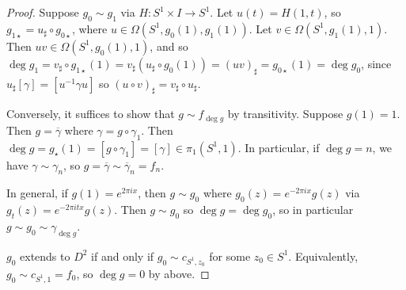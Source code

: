 \begin{proof}
	Suppose \( g_0 \sim g_1 \) via \( H \colon S^1 \times I \to S^1 \).
	Let \( u(t) = H(1,t) \), so \( g_{1\star} = u_\sharp \circ g_{0\star} \), where \( u \in \Omega(S^1,g_0(1),g_1(1)) \).
	Let \( v \in \Omega(S^1,g_1(1),1) \).
	Then \( uv \in \Omega(S^1,g_0(1),1) \), and so \( \deg g_1 = v_\sharp \circ g_{1\star}(1) = v_\sharp(u_\sharp\circ g_0(1)) = (uv)_\sharp = g_{0\star}(1) = \deg g_0 \), since \( u_\sharp[\gamma] = [u^{-1}\gamma u] \) so \( (u \circ v)_\sharp = v_\sharp \circ u_\sharp \).

	Conversely, it suffices to show that \( g \sim f_{\deg g} \) by transitivity.
	Suppose \( g(1) = 1 \).
	Then \( g = \overline \gamma \) where \( \gamma = g \circ \gamma_1 \).
	Then \( \deg g = g_\star(1) = [g \circ \gamma_1] = [\gamma] \in \pi_1(S^1,1) \).
	In particular, if \( \deg g = n \), we have \( \gamma \sim \gamma_n \), so \( g = \overline \gamma \sim \overline \gamma_n = f_n \).

	In general, if \( g(1) = e^{2\pi i x} \), then \( g \sim g_0 \) where \( g_0(z) = e^{-2\pi i x}g(z) \) via \( g_t(z) = e^{-2\pi i t x}g(z) \).
	Then \( g \sim g_0 \) so \( \deg g = \deg g_0 \), so in particular \( g \sim g_0 \sim \gamma_{\deg g} \).

	\( g_0 \) extends to \( D^2 \) if and only if \( g_0 \sim c_{S^1,z_0} \) for some \( z_0 \in S^1 \).
	Equivalently, \( g_0 \sim c_{S^1,1} = f_0 \), so \( \deg g = 0 \) by above.
\end{proof}

